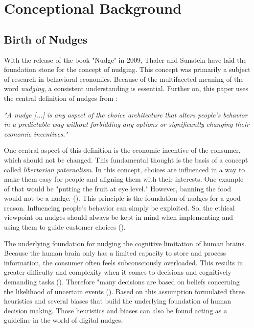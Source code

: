 \section{Conceptional Background}

\subsection{ Birth of Nudges}
With the release of the book "Nudge" in 2009, Thaler and Sunstein have laid the foundation stone for the concept of nudging. This concept was primarily a subject of research in behavioral economics. Because of the multifaceted meaning of the word \textit{nudging}, a consistent understanding is essential. Further on, this paper uses the central definition of nudges from \cite{thaler_nudge:_2009}:
\begin{center}
\textit{"A nudge [...] is any aspect of the choice architecture that alters people's behavior in a predictable way without forbidding any options or significantly changing their economic incentives."}
\end{center}

One central aspect of this definition is the economic incentive of the consumer, which should not be changed. This fundamental thought is the basis of a concept called \textit{libertarian paternalism}. In this concept, choices are influenced in a way to make them easy for people and aligning them with their interests. One example of that would be "putting the fruit at eye level." However, banning the food would not be a nudge. (\cite{thaler_nudge:_2009}). This principle is the foundation of nudges for a good reason. Influencing people's behavior can simply be exploited. So, the ethical viewpoint on nudges should always be kept in mind when implementing and using them to guide customer choices (\cite{sunstein_nudging_2015}).

The underlying foundation for nudging the cognitive limitation of human brains. Because the human brain only has a limited capacity to store and process information, the consumer often feels subconsciously overloaded. This results in greater difficulty and complexity when it comes to decisions and cognitively demanding tasks (\cite{broniarczyk_decision_2014}). Therefore "many decisions are based on beliefs concerning the likelihood of uncertain events (\cite{tversky_judgment_1974}). Based on this assumption \cite{tversky_judgment_1974} formulated three heuristics and several biases that build the underlying foundation of human decision making. Those heuristics and biases can also be found acting as a guideline in the world of digital nudges.

